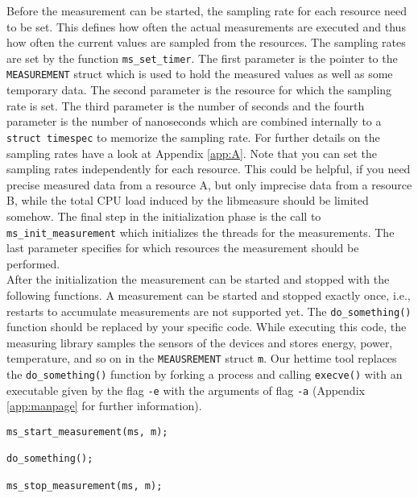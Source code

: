Before the measurement can be started, the sampling rate for each resource need to be set. This defines how often the actual measurements are executed and thus how often the current values are sampled from the resources. The sampling rates are set by the function \texttt{ms\_set\_timer}. The first parameter is the pointer to the \texttt{MEASUREMENT} struct which is used to hold the measured values as well as some temporary data. The second parameter is the resource for which the sampling rate is set. The third parameter is the number of seconds and the fourth parameter is the number of nanoseconds which are combined internally to a \texttt{struct timespec} to memorize the sampling rate. For further details on the sampling rates have a look at Appendix \ref{app:A}. Note that you can set the sampling rates independently for each resource. This could be helpful, if you need precise measured data from a resource A, but only imprecise data from a resource B, while the total CPU load induced by the libmeasure should be limited somehow. The final step in the initialization phase is the call to \texttt{ms\_init\_measurement} which initializes the threads for the measurements. The last parameter specifies for which resources the measurement should be performed.\\

After the initialization the measurement can be started and stopped with the following functions. A measurement can be started and stopped exactly once, i.e., restarts to accumulate measurements are not supported yet. The \texttt{do\_something()} function should be replaced by your specific code. While executing this code, the measuring library samples the sensors of the devices and stores energy, power, temperature, and so on in the \texttt{MEAUSREMENT} struct \texttt{m}. Our hettime tool replaces the \texttt{do\_something()} function by forking a process and calling \texttt{execve()} with an executable given by the flag \texttt{-e} with the arguments of flag \texttt{-a} (Appendix \ref{app:manpage} for further information).
\begin{lstlisting}[caption={The start and stop functions trigger the measuring procedures of the measuring library. Please replace the \texttt{do\_something()} function by the code you want to execute while the measuring system is running.},label=lst:StartStopMS]
ms_start_measurement(ms, m);

do_something();

ms_stop_measurement(ms, m);
\end{lstlisting}


